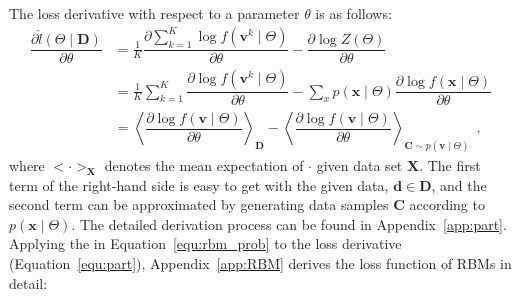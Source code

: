 %

The loss derivative with respect to a parameter $\theta$ is as follows:
\begin{equation}
\label{equ:part}
\begin{aligned}
\dfrac{\partial \hat{l} (\Theta \mid \mathbf{D})}{\partial \theta} 
& = \frac{1}{K} \dfrac{\partial \sum_{k=1}^K\log f(\mathbf{v}^k \mid \Theta )}{\partial \theta} - \dfrac{\partial \log Z( \Theta)}{\partial \theta}\\
& =  \frac{1}{K}\sum_{k=1}^K \dfrac{\partial \log f(\mathbf{v}^k \mid \Theta)}{\partial \theta} - \sum_x p(\mathbf{x} \mid \Theta) \dfrac{\partial \log f(\mathbf{x} \mid \Theta)}{\partial \theta}\\
& = \left \langle \dfrac{\partial \log f(\mathbf{v} \mid \Theta)}{\partial \theta}\right \rangle_{\mathbf{D}} -\left \langle \dfrac{\partial \log f(\mathbf{v} \mid \Theta)}{\partial \theta}\right \rangle_{\mathbf{C} \sim p(\mathbf{v} \mid \Theta)} ~~,
\end{aligned}
\end{equation}
where  $ <\cdot>_{\mathbf{X}} $ denotes the mean expectation of $ \cdot $ given data set $\mathbf{X}$.
The first term of the right-hand side is easy to get with the given data, $\mathbf{d} \in \mathbf{D} $, and the second term can be approximated by generating data samples $\mathbf{C} $ according to $ p(\mathbf{x} \mid \Theta) $.
The detailed derivation process can be found in Appendix~\ref{app:part}.
Applying the \DIFdelbegin {}\DIFdelend \DIFaddbegin {}\DIFaddend in Equation~\ref{equ:rbm_prob} to the loss derivative (Equation~\ref{equ:part}), Appendix~\ref{app:RBM} derives the loss function of RBMs in detail:
